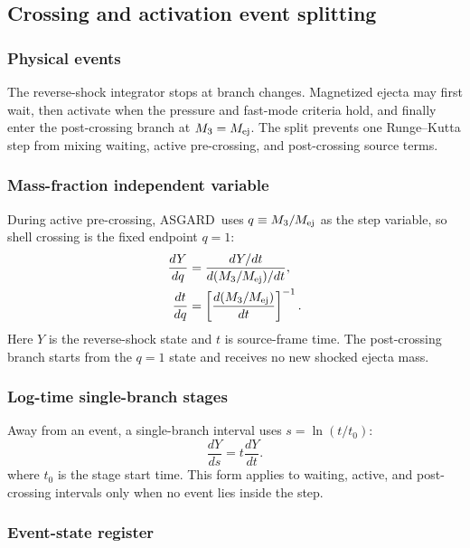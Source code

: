 \documentclass[twocolumn]{aastex702}
\newcommand{\asgard}{\textsc{ASGARD}}
\begin{document}
\subsection{Crossing and activation event splitting}

\subsubsection{Physical events}

The reverse-shock integrator stops at branch changes.  Magnetized ejecta may
first wait, then activate when the pressure and fast-mode criteria hold, and
finally enter the post-crossing branch at \(M_3=M_{\rm ej}\).  The split prevents
one Runge--Kutta step from mixing waiting, active pre-crossing, and post-crossing
source terms.

\subsubsection{Mass-fraction independent variable}

During active pre-crossing, \asgard\ uses \(q\equiv M_3/M_{\rm ej}\) as the step
variable, so shell crossing is the fixed endpoint \(q=1\):
\begin{equation}
\begin{aligned}
\frac{dY}{dq}
&=\frac{dY/dt}{d(M_3/M_{\rm ej})/dt},\\
\frac{dt}{dq}
&=\left[\frac{d(M_3/M_{\rm ej})}{dt}\right]^{-1}.
\end{aligned}
\end{equation}
Here \(Y\) is the reverse-shock state and \(t\) is source-frame time.  The
post-crossing branch starts from the \(q=1\) state and receives no new shocked
ejecta mass.

\subsubsection{Log-time single-branch stages}

Away from an event, a single-branch interval uses \(s=\ln(t/t_0)\):
\begin{equation}
\frac{dY}{ds}=t\frac{dY}{dt}.
\end{equation}
where \(t_0\) is the stage start time.  This form applies to waiting, active, and
post-crossing intervals only when no event lies inside the step.

\subsubsection{Event-state register}
\end{document}
